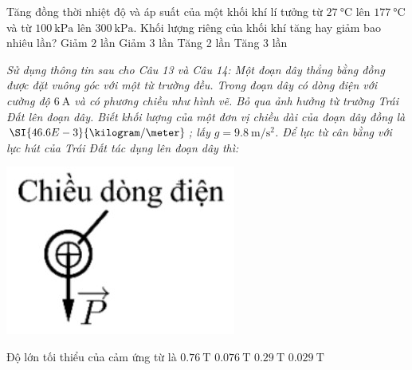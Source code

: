 \begin{ex}
	Tăng đồng thời nhiệt độ và áp suất của một khối khí lí tưởng từ $\SI{27}{\celsius}$ lên $\SI{177}{\celsius}$ và từ $\SI{100}{\kilo\pascal}$ lên $\SI{300}{\kilo\pascal}$. Khối lượng riêng của khối khí tăng hay giảm bao nhiêu lần?
	\choice
	{Giảm 2 lần}
	{Giảm 3 lần}
	{\True Tăng 2 lần}
	{Tăng 3 lần}
\end{ex}
\textit{Sử dụng thông tin sau cho Câu 13 và Câu 14: Một đoạn dây thẳng bằng đồng được đặt vuông góc với một từ trường đều. Trong đoạn dây có dòng điện với cường độ $\SI{6}{\ampere}$ và có phương chiều như hình vẽ. Bỏ qua ảnh hưởng từ trường Trái Đất lên đoạn dây. Biết khối lượng của một đơn vị chiều dài của đoạn dây đồng là $\SI{46.6E-3}{\kilogram/\meter}$; lấy $g=\SI{9.8}{\meter/\second^2}$. Để lực từ cân bằng với lực hút của Trái Đất tác dụng lên đoạn dây thì:}
\begin{ex}
	{\includegraphics[scale=0.6]{../figs/FINAL-SEM1-004-3}}
	\loigiai{}
\end{ex}
\begin{ex}
	Độ lớn tối thiểu của cảm ứng từ là
	\choice
	{$\SI{0.76}{\tesla}$}
	{\True $\SI{0.076}{\tesla}$}
	{$\SI{0.29}{\tesla}$}
	{$\SI{0.029}{\tesla}$}
\end{ex}

